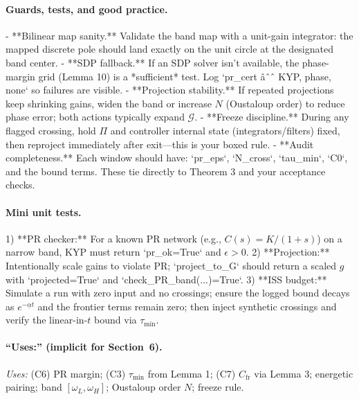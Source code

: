 \paragraph{Guards, tests, and good practice.}
- **Bilinear map sanity.** Validate the band map with a unit-gain integrator: the mapped discrete pole should land exactly on the unit circle at the designated band center.  
- **SDP fallback.** If an SDP solver isn't available, the phase-margin grid (Lemma 10) is a *sufficient* test. Log `pr\_cert âˆˆ {KYP, phase, none}` so failures are visible.  
- **Projection stability.** If repeated projections keep shrinking gains, widen the band or increase \(N\) (Oustaloup order) to reduce phase error; both actions typically expand \(\mathcal G\).  
- **Freeze discipline.** During any flagged crossing, hold \(\Pi\) and controller internal state (integrators/filters) fixed, then reproject immediately after exit---this is your boxed rule.  
- **Audit completeness.** Each window should have: `pr\_eps`, `N\_cross`, `tau\_min`, `C0`, and the bound terms. These tie directly to Theorem 3 and your acceptance checks.

\paragraph{Mini unit tests.}
1) **PR checker:** For a known PR network (e.g., \(C(s)=K/(1+s)\)) on a narrow band, KYP must return `pr\_ok=True` and \(\epsilon>0\).  
2) **Projection:** Intentionally scale gains to violate PR; `project\_to\_G` should return a scaled \(g\) with `projected=True` and `check\_PR\_band(...)=True`.  
3) **ISS budget:** Simulate a run with zero input and no crossings; ensure the logged bound decays as \(e^{-\underline\alpha t}\) and the frontier terms remain zero; then inject synthetic crossings and verify the linear-in-\(t\) bound via \(\tau_{\min}\).

\paragraph{``Uses:'' (implicit for Section~6).}
\emph{Uses: } (C6) PR margin; (C3) \(\tau_{\min}\) from Lemma 1; (C7) \(C_{\mathrm{fr}}\) via Lemma 3; energetic pairing; band \([\omega_L,\omega_H]\); Oustaloup order \(N\); freeze rule.


